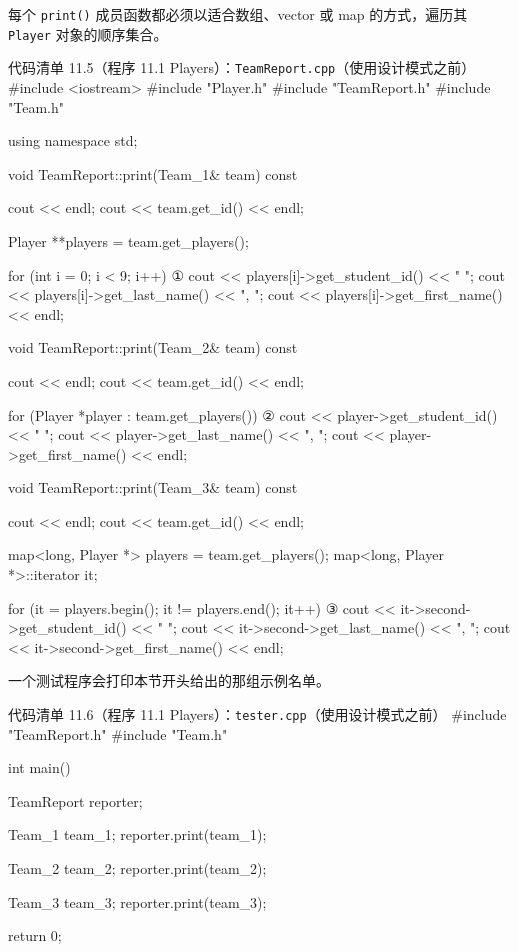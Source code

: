 每个 \texttt{print()} 成员函数都必须以适合数组、vector 或 map 的方式，遍历其 \texttt{Player} 对象的顺序集合。

\begin{codeboxt}{代码清单 11.5（程序 11.1 Players）：\texttt{Team\allowbreak{}Report.\allowbreak{}cpp}（使用设计模式之前）}
#include <iostream>
#include "Player.h"
#include "TeamReport.h"
#include "Team.h"

using namespace std;

void TeamReport::print(Team_1& team) const
{
    cout << endl;
    cout << team.get_id() << endl;

    Player **players = team.get_players();

    for (int i = 0; i < 9; i++)                           ①
    {
        cout << players[i]->get_student_id() << " ";
        cout << players[i]->get_last_name()  << ", ";
        cout << players[i]->get_first_name() << endl;
    }
}

void TeamReport::print(Team_2& team) const
{
    cout << endl;
    cout << team.get_id() << endl;

    for (Player *player : team.get_players())             ②
    {
        cout << player->get_student_id() << " ";
        cout << player->get_last_name()  << ", ";
        cout << player->get_first_name() << endl;
    }

}

void TeamReport::print(Team_3& team) const
{
    cout << endl;
    cout << team.get_id() << endl;

    map<long, Player *> players = team.get_players();
    map<long, Player *>::iterator it;

    for (it = players.begin(); it != players.end(); it++) ③
    {
        cout << it->second->get_student_id() << " ";
        cout << it->second->get_last_name()  << ", ";
        cout << it->second->get_first_name() << endl;
    }
}
\end{codeboxt}
\par
{}\par
{}\par

一个测试程序会打印本节开头给出的那组示例名单。

\begin{codeboxt}{代码清单 11.6（程序 11.1 Players）：\texttt{tester.\allowbreak{}cpp}（使用设计模式之前）}
#include "TeamReport.h"
#include "Team.h"

int main()
{
    TeamReport reporter;

    Team_1 team_1;
    reporter.print(team_1);

    Team_2 team_2;
    reporter.print(team_2);

    Team_3 team_3;
    reporter.print(team_3);

    return 0;
}
\end{codeboxt}

